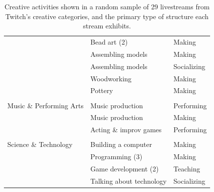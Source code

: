 \begin{table}[b!]
{\begin{tabular}{lll}
                         & Bead art (2)                                    & Making                                                                    \\
                         & Assembling models                               & Making                                                                    \\
                         & Assembling models                               & Socializing                                                               \\
                         & Woodworking                                     & Making                                                                    \\
                         & Pottery                                         & Making                                                                    \\
                         &                                                 &                                                                           \\
Music \& Performing Arts & Music production                                & Performing                                                                \\
                         & Music production                                & Making                                                                    \\
                         & Acting \& improv games                          & Performing                                                                \\
                         &                                                 &                                                                           \\
Science \& Technology    & Building a computer                             & Making                                                                    \\
                         & Programming (3)                                 & Making                                                                    \\
                         & Game development (2)                            & Teaching                                                                  \\
                         & Talking about technology                        & Socializing                                                              
\end{tabular}
}
\caption{Creative activities shown in a random sample of 29 livestreams from Twitch's creative categories, and the primary type of structure each stream exhibits.}~\label{table:activities}
\vspace{-0.15in}
\end{table}

